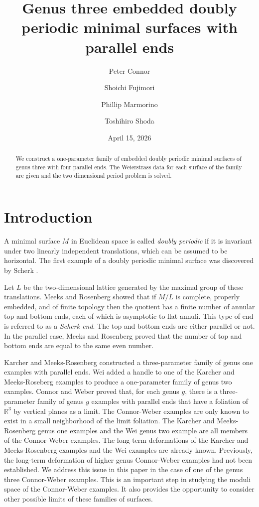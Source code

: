 \documentclass[11pt]{amsart}
\title[Doubly periodic minimal surfaces]
{Genus three embedded doubly periodic minimal surfaces with parallel ends}
\date{April 15, 2026}
\author[P.~Connor]
{Peter Connor}
\author[S.~Fujimori]
{Shoichi Fujimori}
\author[P.~Marmorino]
{Phillip Marmorino}
\author[T.~Shoda]
{Toshihiro Shoda}
\newcommand{\R}{\mathbb{R}}
\numberwithin{equation}{section}
\numberwithin{figure}{section}
\theoremstyle{plain} %
\theoremstyle{definition} %
\begin{document}
\begin{abstract}
We construct a one-parameter family of embedded doubly periodic minimal surfaces of genus three with four parallel ends.
The Weierstrass data for each surface of the family are given and the two dimensional period problem is solved.
\end{abstract}

\maketitle

\section{Introduction}
A minimal surface $M$ in Euclidean space is called {\it doubly periodic} if it is invariant under two linearly independent translations, which can be assumed to be horizontal.  The first example of a doubly periodic minimal surface was discovered by Scherk \cite{sche1}.

Let $L$ be the two-dimensional lattice generated by the maximal group of these translations.  Meeks and Rosenberg \cite{mr3} showed that if $M/L$ is complete, properly embedded, and of finite topology then the quotient has a finite number of annular top and bottom ends, each of which is asymptotic to flat annuli.  This type of end is referred to as a {\it Scherk end}.  The top and bottom ends are either parallel or not.  In the parallel case, Meeks and Rosenberg proved that the number of top and bottom ends are equal to the same even number.  

Karcher \cite{ka4} and Meeks-Rosenberg \cite{mr3} constructed a three-parameter family of genus one examples with parallel ends.  Wei \cite{wei2} added a handle to one of the Karcher and Meeks-Roseberg examples to produce a one-parameter family of genus two examples.  Connor and Weber \cite{cw1} proved that, for each genus $g$, there is a three-parameter family of genus $g$ examples with parallel ends that have a foliation of $\R^3$ by vertical planes as a limit.  The Connor-Weber examples are only known to exist in a small neighborhood of the limit foliation.  The Karcher and Meeks-Rosenberg genus one examples and the Wei genus two example are all members of the Connor-Weber examples.  The long-term deformations of the Karcher and Meeks-Rosenberg examples and the Wei examples are already known.  Previously, the long-term deformation of higher genus Connor-Weber examples had not been established.  We address this issue in this paper in the case of one of the genus three Connor-Weber examples.  This is an important step in studying the moduli space of the Connor-Weber examples.  It also provides the opportunity to consider other possible limits of these families of surfaces.
\end{document}
